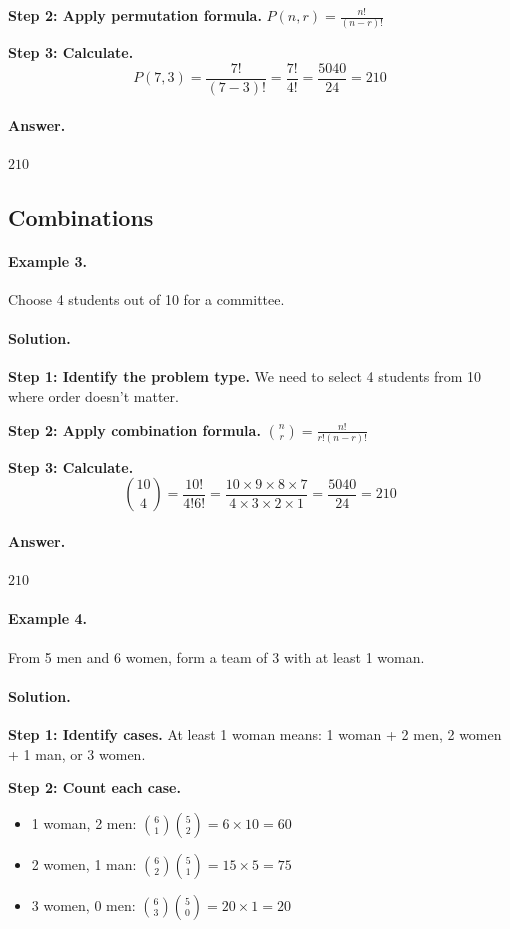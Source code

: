 \documentclass[12pt]{extarticle}
\begin{document}
\textbf{Step 2: Apply permutation formula.} $P(n,r) = \frac{n!}{(n-r)!}$

\textbf{Step 3: Calculate.}
\[
P(7,3) = \frac{7!}{(7-3)!} = \frac{7!}{4!} = \frac{5040}{24} = 210
\]

\paragraph{Answer.} $\boxed{210}$

\subsection{Combinations}

\paragraph{Example 3.} Choose 4 students out of 10 for a committee.

\paragraph{Solution.}
\textbf{Step 1: Identify the problem type.} We need to select 4 students from 10 where order doesn't matter.

\textbf{Step 2: Apply combination formula.} $\binom{n}{r} = \frac{n!}{r!(n-r)!}$

\textbf{Step 3: Calculate.}
\[
\binom{10}{4} = \frac{10!}{4!6!} = \frac{10 \times 9 \times 8 \times 7}{4 \times 3 \times 2 \times 1} = \frac{5040}{24} = 210
\]

\paragraph{Answer.} $\boxed{210}$

\paragraph{Example 4.} From 5 men and 6 women, form a team of 3 with at least 1 woman.

\paragraph{Solution.}
\textbf{Step 1: Identify cases.} At least 1 woman means: 1 woman + 2 men, 2 women + 1 man, or 3 women.

\textbf{Step 2: Count each case.}
\begin{itemize}
    \item 1 woman, 2 men: $\binom{6}{1}\binom{5}{2} = 6 \times 10 = 60$
    \item 2 women, 1 man: $\binom{6}{2}\binom{5}{1} = 15 \times 5 = 75$
    \item 3 women, 0 men: $\binom{6}{3}\binom{5}{0} = 20 \times 1 = 20$
\end{itemize}
\end{document}
